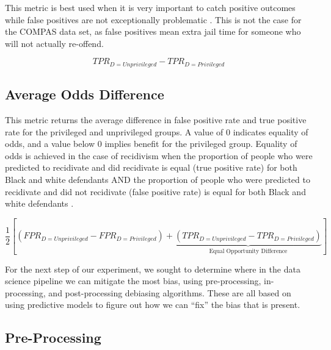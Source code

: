 \documentclass[water,article,submit,moreauthors,pdftex]{mdpi}
\begin{document}
This metric is best used when it is very important to catch positive
outcomes while false positives are not exceptionally problematic
\citep{Cortez2019How}. This is not the case for the COMPAS data set, as
false positives mean extra jail time for someone who will not actually
re-offend.

\[TPR_{D = Unprivileged} - TPR_{D = Privileged}\]

\hypertarget{average-odds-difference}{%
\subsection{Average Odds Difference}\label{average-odds-difference}}

This metric returns the average difference in false positive rate and
true positive rate for the privileged and unprivileged groups. A value
of 0 indicates equality of odds, and a value below 0 implies benefit for
the privileged group. Equality of odds is achieved in the case of
recidivism when the proportion of people who were predicted to
recidivate and did recidivate is equal (true positive rate) for both
Black and white defendants AND the proportion of people who were
predicted to recidivate and did not recidivate (false positive rate) is
equal for both Black and white defendants \citep{aif360-oct-2018}.

\[\frac{1}{2}\left[(FPR_{D = Unprivileged} - FPR_{D = Privileged}) + \underbrace{(TPR_{D = Unprivileged} - TPR_{D = Privileged})}_\textrm{Equal Opportunity Difference}\right]\]

For the next step of our experiment, we sought to determine where in the
data science pipeline we can mitigate the most bias, using
pre-processing, in-processing, and post-processing debiasing algorithms.
These are all based on using predictive models to figure out how we can
``fix'' the bias that is present.

\hypertarget{pre-processing}{%
\subsection{Pre-Processing}\label{pre-processing}}
\end{document}

